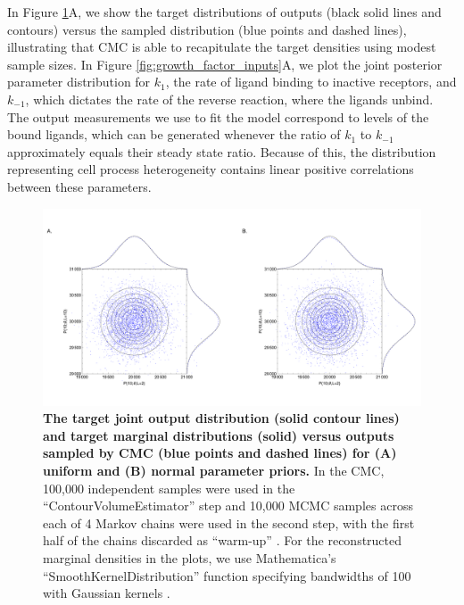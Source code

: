 \documentclass[10pt,letterpaper]{article}
\begin{document}
In Figure \ref{fig:growth_factor_outputs}A, we show the target distributions of outputs (black solid lines and contours) versus the sampled distribution (blue points and dashed lines), illustrating that CMC is able to recapitulate the target densities using modest sample sizes. In Figure \ref{fig:growth_factor_inputs}A, we plot the joint posterior parameter distribution for $k_1$, the rate of ligand binding to inactive receptors, and $k_{-1}$, which dictates the rate of the reverse reaction, where the ligands unbind. The output measurements we use to fit the model correspond to levels of the bound ligands, which can be generated whenever the ratio of $k_1$ to $k_{-1}$ approximately equals their steady state ratio. Because of this, the distribution representing cell process heterogeneity contains linear positive correlations between these parameters.

\begin{figure}[H]
	\centerline{\includegraphics[width=\textwidth]{../figures/growth_factor_outputs.pdf}}
	\caption{\textbf{The target joint output distribution (solid contour lines) and target marginal distributions (solid) versus outputs sampled by CMC (blue points and dashed lines) for (A) uniform and (B) normal parameter priors.} In the CMC, 100,000 independent samples were used in the ``ContourVolumeEstimator'' step and 10,000 MCMC samples across each of 4 Markov chains were used in the second step, with the first half of the chains discarded as ``warm-up'' \cite{lambert2018Student}. For the reconstructed marginal densities in the plots, we use Mathematica's ``SmoothKernelDistribution'' function specifying bandwidths of 100 with Gaussian kernels \cite{mathematica}.}
	\label{fig:growth_factor_outputs}
\end{figure}
\end{document}
